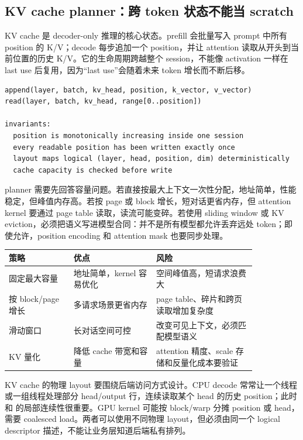 \subsection{KV cache planner：跨 token 状态不能当 scratch}

KV cache 是 decoder-only 推理的核心状态。prefill 会批量写入 prompt 中所有 position 的 K/V；decode 每步追加一个 position，并让 attention 读取从开头到当前位置的历史 K/V。它的生命周期跨越整个 session，不能像 activation 一样在 last use 后复用，因为“last use”会随着未来 token 增长而不断后移。

\begin{lstlisting}[numbers=none,caption={KV cache 的逻辑合同}]
append(layer, batch, kv_head, position, k_vector, v_vector)
read(layer, batch, kv_head, range[0..position])

invariants:
  position is monotonically increasing inside one session
  every readable position has been written exactly once
  layout maps logical (layer, head, position, dim) deterministically
  cache capacity is checked before write
\end{lstlisting}

planner 需要先回答容量问题。若直接按最大上下文一次性分配，地址简单，性能稳定，但峰值内存高。若按 page 或 block 增长，短对话更省内存，但 attention kernel 要通过 page table 读取，读流可能变碎。若使用 sliding window 或 KV eviction，必须把语义写进模型合同：并不是所有模型都允许丢弃远处 token；即使允许，position encoding 和 attention mask 也要同步处理。

\begin{center}
\begin{tabular}{p{0.22\linewidth}p{0.28\linewidth}p{0.34\linewidth}}
\toprule
策略 & 优点 & 风险 \\
\midrule
固定最大容量 & 地址简单，kernel 容易优化 & 空间峰值高，短请求浪费大 \\
按 block/page 增长 & 多请求场景更省内存 & page table、碎片和跨页读取增加复杂度 \\
滑动窗口 & 长对话空间可控 & 改变可见上下文，必须匹配模型语义 \\
KV 量化 & 降低 cache 带宽和容量 & attention 精度、scale 存储和反量化成本要验证 \\
\bottomrule
\end{tabular}
\end{center}

KV cache 的物理 layout 要围绕后端访问方式设计。CPU decode 常常让一个线程或一组线程处理部分 head/output 行，连续读取某个 head 的历史 position；此时  和  的局部连续性很重要。GPU kernel 可能按 block/warp 分摊 position 或 head，需要 coalesced load。两者可以使用不同物理 layout，但必须由同一个 logical descriptor 描述，不能让业务层知道后端私有排列。

